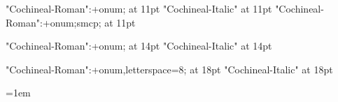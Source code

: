 



\font\elevenrm "Cochineal-Roman":+onum; at 11pt\relax
\font\elevenit "Cochineal-Italic" at 11pt\relax
\font\elevensc "Cochineal-Roman":+onum;smcp; at 11pt\relax

\font\fourteenrm "Cochineal-Roman":+onum; at 14pt\relax
\font\fourteenit "Cochineal-Italic" at 14pt\relax

\font\eighteenrm "Cochineal-Roman":+onum,letterspace=8; at 18pt\relax
\font\eighteenit "Cochineal-Italic" at 18pt\relax


\def\normalsize{%
	\gdef\rm{\elevenrm}%
	\gdef\it{\elevenit}%
	\gdef\sc{\elevensc}%
}

\def\chaptersize{%
	\gdef\rm{\fourteenrm}%
	\gdef\it{\fourteenit}%
}

\def\titlesize{%
	\gdef\rm{\eighteenrm}%
	\gdef\it{\eighteenit}%
}

\let\emph\it

\normalsize\rm


\baselineskip=14.7pt

\frenchspacing

\parskip=0pt

\parindent=1em

\emergencystretch=1pt
\hfuzz=0pt

\def\firstnoindent{\global\everypar={\wipeeverypar\setbox7=\lastbox}}
\def\wipeeverypar{\global\everypar={}}

{}



